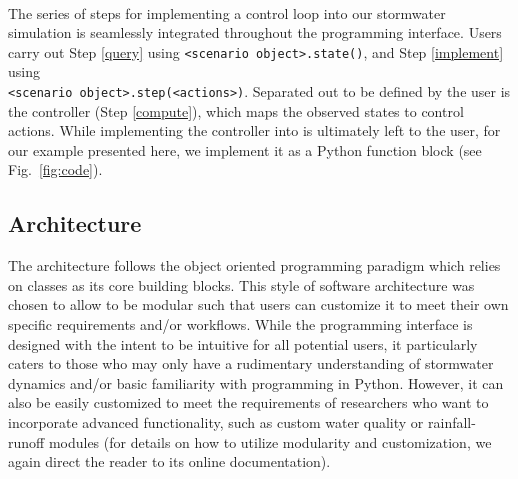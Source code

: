 \

The series of steps for implementing a control loop into our stormwater simulation is seamlessly integrated throughout the \pystorms programming interface. Users carry out Step \ref{query} using \texttt{<scenario object>.state()}, and Step \ref{implement} using \\ 
\texttt{<scenario object>.step(<actions>)}. Separated out to be defined by the user is the controller (Step \ref{compute}), which maps the observed states to control actions. While implementing the controller into \pystorms is ultimately left to the user, for our example presented here, we implement it as a Python function block (see Fig.~\ref{fig:code}).
%
%
%
\subsection{Architecture}
\label{subsec:architecture}
%
%
%
The \pystorms architecture follows the object oriented programming paradigm which relies on classes as its core building blocks. This style of software architecture was chosen to allow \pystorms to be modular such that users can customize it to meet their own specific requirements and/or workflows.  While the \pystorms programming interface is designed with the intent to be intuitive for all potential users, it particularly caters to those who may only have a rudimentary understanding of stormwater dynamics and/or basic familiarity with programming in Python. However, it can also be easily customized to meet the requirements of researchers who want to incorporate advanced functionality, such as custom water quality or rainfall-runoff modules (for details on how to utilize \pystorms modularity and customization, we again direct the reader to its online documentation). 

\


